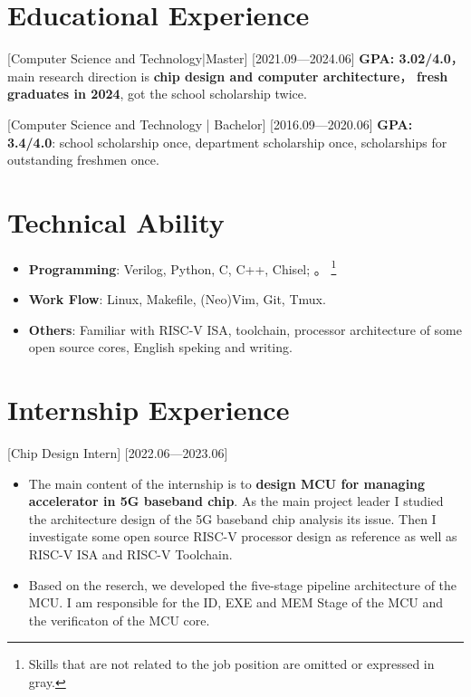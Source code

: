 \documentclass{resume}
\begin{document}

\ResumeTitle

\section{Educational Experience}
[\textnormal{Computer Science and Technology}|Master]
[2021.09—2024.06]
\textbf{GPA: 3.02/4.0}，main research direction is \textbf{chip design and computer architecture}，
\textbf{fresh graduates in 2024}, got the school scholarship twice.

[\textnormal{Computer Science and Technology} | Bachelor]
[2016.09—2020.06]
\textbf{GPA: 3.4/4.0}: school scholarship once, department scholarship once, scholarships for outstanding freshmen once.

\section{Technical Ability}
\begin{itemize}
  \item \textbf{Programming}: Verilog, Python, C, C++, Chisel; 。
      \footnote{Skills that are not related to the job position are omitted or expressed in gray.}
  \item \textbf{Work Flow}: Linux, Makefile, (Neo)Vim, Git, Tmux.
  \item \textbf{Others}: Familiar with RISC-V ISA, toolchain, processor architecture of some open source cores, English speking and writing.
\end{itemize}

\section{Internship Experience}

[Chip Design Intern]
[2022.06—2023.06] 
\begin{itemize}
    \item The main content of the internship is to \textbf{design MCU for managing accelerator in 5G baseband chip}. As the main project leader
        I studied the architecture design of the 5G baseband chip analysis its issue. 
        Then I investigate some open source RISC-V processor design as reference as well as RISC-V ISA and RISC-V Toolchain. 
    \item Based on the reserch, we developed the five-stage pipeline architecture of the MCU. I am responsible for the ID, EXE and MEM Stage of the MCU and the verificaton of the MCU core.
\end{itemize}
\end{document}
